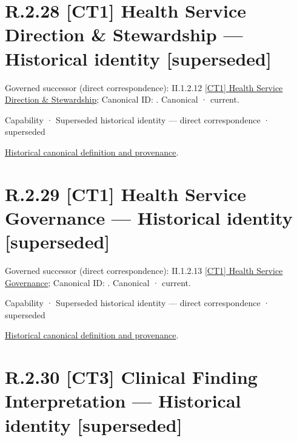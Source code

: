 \section*{R.2.28 [CT1] Health Service Direction \& Stewardship — Historical identity [superseded]}
\label{navigation:R.2.28}

{\small Governed successor (direct correspondence): II.1.2.12 \hyperref[element:d51e7125bf9c4d2c9c59b60346b4d86f]{[CT1] Health Service Direction \& Stewardship}; Canonical ID: \texttt{}. Canonical · current.}\par
\label{element:360bf50f92484448a01cc57f2dbce23c}
{\small Capability · Superseded historical identity — direct correspondence · superseded}\par
\href{../../../../continuum/strategy/capability/360bf50f92484448a01cc57f2dbce23c.md}{Historical canonical definition and provenance}.\par
\section*{R.2.29 [CT1] Health Service Governance — Historical identity [superseded]}
\label{navigation:R.2.29}

{\small Governed successor (direct correspondence): II.1.2.13 \hyperref[element:209aada781e844e28202a2535a264c21]{[CT1] Health Service Governance}; Canonical ID: \texttt{}. Canonical · current.}\par
\label{element:24f3dd30223142efa35a5826552d53ab}
{\small Capability · Superseded historical identity — direct correspondence · superseded}\par
\href{../../../../continuum/strategy/capability/24f3dd30223142efa35a5826552d53ab.md}{Historical canonical definition and provenance}.\par
\section*{R.2.30 [CT3] Clinical Finding Interpretation — Historical identity [superseded]}
\label{navigation:R.2.30}

